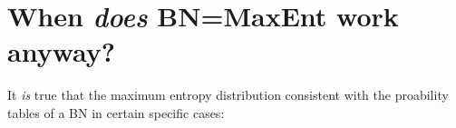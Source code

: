 \documentclass{article}
\begin{document}
%	
%	
%	
	
	
	\section{When \emph{does} BN=MaxEnt work anyway?} \label{sec:cases-works}
	It \emph{is} true that the maximum entropy distribution consistent with the proability tables of a BN in certain specific cases: 
	
\end{document}
